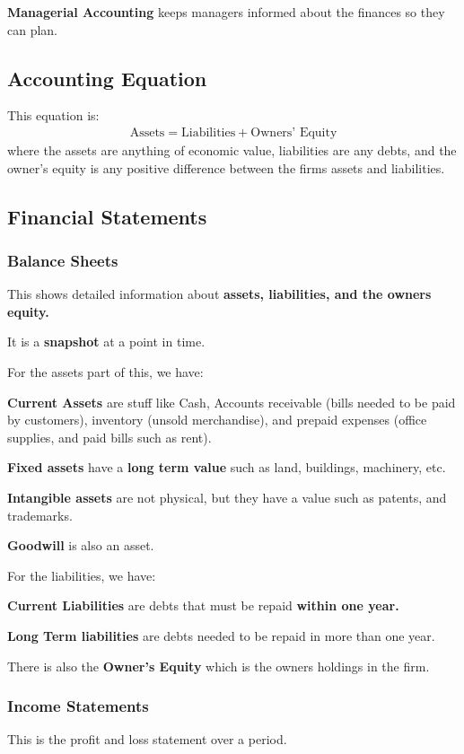 \documentclass[12pt,letterpaper]{article} \usepackage{amsmath} \usepackage{graphicx} \usepackage[margin=1in]{geometry} \usepackage{longtable}  \usepackage{amssymb}
\begin{document}
		\textbf{Managerial Accounting} keeps managers informed about the finances so they can plan.
			
		\subsection{Accounting Equation}
		This equation is: 
		\begin{align*}
			\text{Assets} = \text{Liabilities} + \text{Owners' Equity}
		\end{align*}
		where the assets are anything of economic value, liabilities are any debts, and the owner's equity is any positive difference between the firms assets and liabilities. 
		
		\subsection{Financial Statements}
		
		\subsubsection{Balance Sheets}
		This shows detailed information about \textbf{assets, liabilities, and the owners equity. }
		
		It is a \textbf{snapshot} at a point in time. 
		
		For the assets part of this, we have:
		
		\textbf{Current Assets }are stuff like Cash, Accounts receivable (bills needed to be paid by customers), inventory (unsold merchandise), and prepaid expenses (office supplies, and paid bills such as rent).
		
		\textbf{Fixed assets }have a \textbf{long term value }such as land, buildings, machinery, etc. 
		
		\textbf{Intangible assets }are not physical, but they have a value such as patents, and trademarks. 
		
		\textbf{Goodwill} is also an asset. 
		
		For the liabilities, we have:
		
		\textbf{Current Liabilities} are debts that must be repaid \textbf{within one year.}
		
		\textbf{Long Term liabilities} are debts needed to be repaid in more than one year. 
		
		There is also the \textbf{Owner's Equity} which is the owners holdings in the firm. 
 		\subsubsection{Income Statements}
 		This is the profit and loss statement over a period. 
 		
\end{document}
